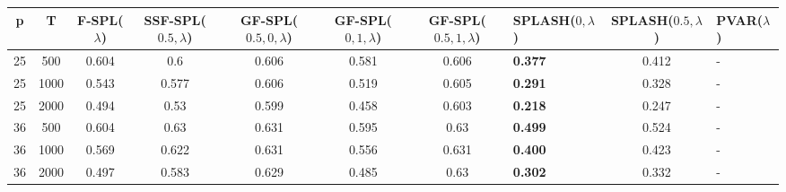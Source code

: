 \begin{tabular}{ccccccclcl}
\hline
  p  &  T   &  F-SPL($\lambda$)  &  SSF-SPL($0.5, \lambda$)  &  GF-SPL($0.5, 0, \lambda$)  &  GF-SPL($0, 1, \lambda$)  &  GF-SPL($0.5, 1, \lambda$)  & SPLASH($0, \lambda$)   &  SPLASH($0.5, \lambda$)  & PVAR($\lambda$)   \\
\hline
 25  & 500  &       0.604        &            0.6            &            0.606            &           0.581           &            0.606            & \textbf{0.377}         &          0.412           & -                 \\
 25  & 1000 &       0.543        &           0.577           &            0.606            &           0.519           &            0.605            & \textbf{0.291}         &          0.328           & -                 \\
 25  & 2000 &       0.494        &           0.53            &            0.599            &           0.458           &            0.603            & \textbf{0.218}         &          0.247           & -                 \\
 36  & 500  &       0.604        &           0.63            &            0.631            &           0.595           &            0.63             & \textbf{0.499}         &          0.524           & -                 \\
 36  & 1000 &       0.569        &           0.622           &            0.631            &           0.556           &            0.631            & \textbf{0.400}         &          0.423           & -                 \\
 36  & 2000 &       0.497        &           0.583           &            0.629            &           0.485           &            0.63             & \textbf{0.302}         &          0.332           & -                 \\
\hline
\end{tabular}
